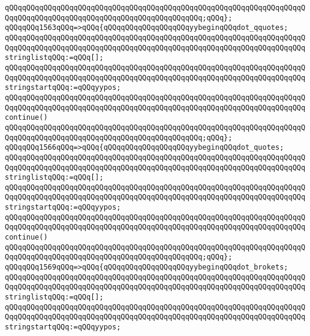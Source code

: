 \verb|qQQqqQQqqQQqqQQqqQQqqQQqqQQqqQQqqQQqqQQqqQQqqQQqqQQqqQQqqQQqqQQqqQQqqQQqqQQqqQQqqQQqqQQqqQQqqQQqqQQqqQQqqQQqqQQqqQQq;qQQq};|\newline
\verb|qQQqqQQq1563qQQq=>qQQq{qQQqqQQqqQQqqQQqqQQqyybeginqQQqdot_qquotes;|\newline
\verb|qQQqqQQqqQQqqQQqqQQqqQQqqQQqqQQqqQQqqQQqqQQqqQQqqQQqqQQqqQQqqQQqqQQqqQQqqQQqqQQqqQQqqQQqqQQqqQQqqQQqqQQqqQQqqQQqqQQqqQQqqQQqqQQqqQQqqQQqqQQqstringlistqQQq:=qQQq[];|\newline
\verb|qQQqqQQqqQQqqQQqqQQqqQQqqQQqqQQqqQQqqQQqqQQqqQQqqQQqqQQqqQQqqQQqqQQqqQQqqQQqqQQqqQQqqQQqqQQqqQQqqQQqqQQqqQQqqQQqqQQqqQQqqQQqqQQqqQQqqQQqqQQqstringstartqQQq:=qQQqyypos;|\newline
\verb|qQQqqQQqqQQqqQQqqQQqqQQqqQQqqQQqqQQqqQQqqQQqqQQqqQQqqQQqqQQqqQQqqQQqqQQqqQQqqQQqqQQqqQQqqQQqqQQqqQQqqQQqqQQqqQQqqQQqqQQqqQQqqQQqqQQqqQQqqQQqcontinue()|\newline
\verb|qQQqqQQqqQQqqQQqqQQqqQQqqQQqqQQqqQQqqQQqqQQqqQQqqQQqqQQqqQQqqQQqqQQqqQQqqQQqqQQqqQQqqQQqqQQqqQQqqQQqqQQqqQQqqQQqqQQq;qQQq};|\newline
\verb|qQQqqQQq1566qQQq=>qQQq{qQQqqQQqqQQqqQQqqQQqyybeginqQQqdot_quotes;|\newline
\verb|qQQqqQQqqQQqqQQqqQQqqQQqqQQqqQQqqQQqqQQqqQQqqQQqqQQqqQQqqQQqqQQqqQQqqQQqqQQqqQQqqQQqqQQqqQQqqQQqqQQqqQQqqQQqqQQqqQQqqQQqqQQqqQQqqQQqqQQqqQQqstringlistqQQq:=qQQq[];|\newline
\verb|qQQqqQQqqQQqqQQqqQQqqQQqqQQqqQQqqQQqqQQqqQQqqQQqqQQqqQQqqQQqqQQqqQQqqQQqqQQqqQQqqQQqqQQqqQQqqQQqqQQqqQQqqQQqqQQqqQQqqQQqqQQqqQQqqQQqqQQqqQQqstringstartqQQq:=qQQqyypos;|\newline
\verb|qQQqqQQqqQQqqQQqqQQqqQQqqQQqqQQqqQQqqQQqqQQqqQQqqQQqqQQqqQQqqQQqqQQqqQQqqQQqqQQqqQQqqQQqqQQqqQQqqQQqqQQqqQQqqQQqqQQqqQQqqQQqqQQqqQQqqQQqqQQqcontinue()|\newline
\verb|qQQqqQQqqQQqqQQqqQQqqQQqqQQqqQQqqQQqqQQqqQQqqQQqqQQqqQQqqQQqqQQqqQQqqQQqqQQqqQQqqQQqqQQqqQQqqQQqqQQqqQQqqQQqqQQqqQQq;qQQq};|\newline
\verb|qQQqqQQq1569qQQq=>qQQq{qQQqqQQqqQQqqQQqqQQqyybeginqQQqdot_brokets;|\newline
\verb|qQQqqQQqqQQqqQQqqQQqqQQqqQQqqQQqqQQqqQQqqQQqqQQqqQQqqQQqqQQqqQQqqQQqqQQqqQQqqQQqqQQqqQQqqQQqqQQqqQQqqQQqqQQqqQQqqQQqqQQqqQQqqQQqqQQqqQQqqQQqstringlistqQQq:=qQQq[];|\newline
\verb|qQQqqQQqqQQqqQQqqQQqqQQqqQQqqQQqqQQqqQQqqQQqqQQqqQQqqQQqqQQqqQQqqQQqqQQqqQQqqQQqqQQqqQQqqQQqqQQqqQQqqQQqqQQqqQQqqQQqqQQqqQQqqQQqqQQqqQQqqQQqstringstartqQQq:=qQQqyypos;|\newline

